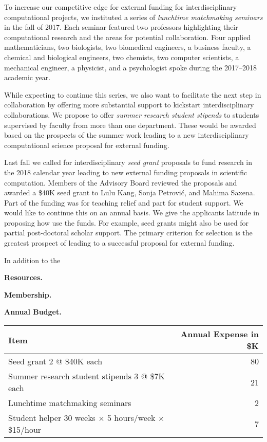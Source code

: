 \documentclass{amsart}
\begin{document}
To increase our competitive edge for external funding for interdisciplinary computational projects, we instituted a series of \emph{lunchtime matchmaking seminars} in the fall of 2017.  Each seminar featured two professors highlighting their computational research and the areas for potential collaboration.  Four applied mathematicians, two biologists, two biomedical engineers, a business faculty, a chemical and biological engineers, two chemists, two computer scientists,  a mechanical engineer, a physicist, and a psychologist spoke during the 2017--2018 academic year.  

While expecting to continue this series, we also want to facilitate the next step in collaboration by offering more substantial support to kickstart interdisciplinary collaborations.  We propose to offer \emph{summer research student stipends} to students supervised by faculty from more than one department.  These would be awarded based on the prospects of the summer work leading to a new interdisciplinary computational science proposal for external funding. 

Last fall we called for interdisciplinary \emph{seed grant} proposals to fund research in the 2018 calendar year leading to new external funding proposals in scientific computation.  Members of the Advisory Board reviewed the proposals and awarded a \$40K seed grant to Lulu Kang, Sonja Petrovi\'c, and Mahima Saxena. Part of the funding was for teaching relief and part for student support.  We would like to continue this on an annual basis.  We give the applicants latitude in proposing how use the funds.  For example, seed grants might also be used for partial post-doctoral scholar support.  The primary criterion for selection is the greatest prospect of leading to a successful proposal for external funding.

In addition to the 

\textbf{Resources.}

\textbf{Membership.} 


\textbf{Annual Budget.} 

\begin{tabular}{l@{\qquad} r}
\textbf{Item} & \textbf{Annual Expense in \$K} \\
\toprule
    Seed grant 2 @ \$40K each & 80 \\
    Summer research student stipends 3 @ \$7K each & 21 \\
    Lunchtime matchmaking seminars & 2 \\
    Student helper 30 weeks $\times$ 5 hours/week $\times$ \$15/hour & 7
\end{tabular}
\end{document}
